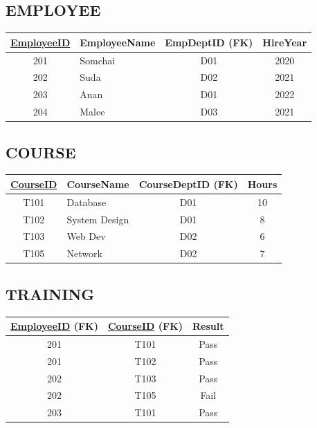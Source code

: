 \documentclass[a4paper,12pt]{article}
\newcommand{\pk}[1]{\uline{#1}}
\begin{document}
\subsection*{EMPLOYEE}
\begin{center}
\renewcommand{\arraystretch}{1.15}
\small
\begin{tabular}{|c|l|c|c|}
    \hline
    \rowcolor{cyan!15}
    \pk{EmployeeID} & EmployeeName & EmpDeptID (FK) & HireYear \\
    \hline
    201 & Somchai & D01 & 2020 \\
    202 & Suda & D02 & 2021 \\
    203 & Anan & D01 & 2022 \\
    204 & Malee & D03 & 2021 \\
    \hline
\end{tabular}
\end{center}

\subsection*{COURSE}
\begin{center}
\renewcommand{\arraystretch}{1.15}
\small
\begin{tabular}{|c|l|c|c|}
    \hline
    \rowcolor{cyan!15}
    \pk{CourseID} & CourseName & CourseDeptID (FK) & Hours \\
    \hline
    T101 & Database & D01 & 10 \\
    T102 & System Design & D01 & 8 \\
    T103 & Web Dev & D02 & 6 \\
    T105 & Network & D02 & 7 \\
    \hline
\end{tabular}
\end{center}

\subsection*{TRAINING}
\begin{center}
\renewcommand{\arraystretch}{1.15}
\small
\begin{tabular}{|c|c|c|}
    \hline
    \rowcolor{cyan!15}
    \pk{EmployeeID} (FK) & \pk{CourseID} (FK) & Result \\
    \hline
    201 & T101 & Pass \\
    201 & T102 & Pass \\
    202 & T103 & Pass \\
    202 & T105 & Fail \\
    203 & T101 & Pass \\
    \hline
\end{tabular}
\end{center}
\end{document}

